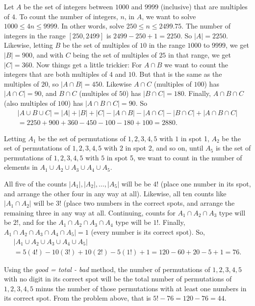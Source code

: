 \begin{Solution}{31.3}
Let $A$ be the set of integers between $1000$ and $9999$ (inclusive) that are multiples of $4$.
To count the number of integers, $n$, in $A$, we want to solve $1000\leq 4n \leq 9999$. In other 
words, solve $250 \leq n \leq 2499.75$. The number of integers in the range $[250,2499]$ is
$2499-250+1 = 2250$. So $|A| = 2250$. Likewise, letting $B$ be the set of multiples of $10$ in the range
$1000$ to $9999$, we get $|B| = 900$, and with $C$ being the set of multiples of $25$ in that range,
we get $|C|= 360$. Now things get a little trickier: For $A \cap B$ we want to count the integers that are both multiples of $4$ and $10$. But that is the same as the multiples of $20$, so $|A \cap B| = 450$.
Likewise $A \cap C$ (multiples of $100$) has $|A \cap C| = 90$, and $B \cap C$ (multiples of $50$)
has $|B \cap C| = 180$. Finally, $A \cap B \cap C$ (also multiples of $100$)  has $|A \cap B \cap C| = 90$.
So
\begin{gather*}
|A \cup B \cup C| = |A| + |B| + |C| - |A \cap B| -|A \cap C| - |B \cap C| + |A\cap B \cap C|\\
= 2250 +900+360 - 450 -100 - 180 + 100 = 2880.
\end{gather*}

\end{Solution}

\begin{Solution}{31.4}

Letting $A_1$ be the set of permutations of $1,2,3,4,5$ with $1$ in spot 1, $A_2$ be the set of permutations of $1,2,3,4,5$ with $2$ in spot 2, and so on, until $A_5$ is the set of permutations of $1,2,3,4,5$ with $5$ in spot 5,
we want to count in the number of elements in $A_1 \cup A_2 \cup A_3 \cup A_4 \cup A_5$. 

All five of the counts $|A_1|, |A_2|, \ldots, |A_5|$ will be be $4!$ (place one number in its spot, and arrange the other four in any way at all). Likewise, all ten counts like $|A_1 \cap A_2|$ will be $3!$ (place two numbers in the correct spots, and arrange the remaining three in any way at all. Continuing, counts for $A_1 \cap A_2 \cap A_3$
type will be $2!$, and for the $A_1 \cap A_2 \cap A_3 \cap A_4$ type will be $1!$. Finally, $A_1 \cap A_2 \cap A_3 \cap A_4 \cap A_5| = 1$ (every number is its correct spot). So,
\begin{gather*}
|A_1 \cup A_2 \cup A_3 \cup A_4 \cup A_5|\\
 = 5(4!) - 10(3!) + 10(2!) - 5(1!) + 1
= 120 - 60 + 20 - 5 + 1 = 76. 
\end{gather*}

\end{Solution}

\begin{Solution}{31.5}

Using the {\it good = total - bad} method, the number of permutations of $1,2,3,4,5$ with no digit in its correct spot
will be the total number of permutations of $1,2,3,4,5$ minus the number of those permutations with at least one numbers in its correct spot.  From the problem above, that is $5! - 76 = 120 - 76 = 44$. 

\end{Solution}

